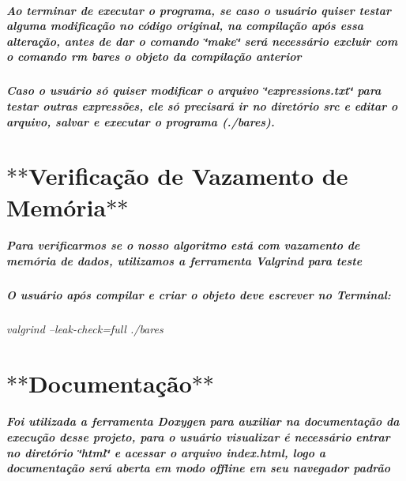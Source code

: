 \subparagraph*{Ao terminar de executar o programa, se caso o usuário quiser testar alguma modificação no código original, na compilação após essa alteração, antes de dar o comando \char`\"{}make\char`\"{} será necessário excluir com o comando {\itshape rm bares} o objeto da compilação anterior}

\subparagraph*{Caso o usuário só quiser modificar o arquivo \char`\"{}expressions.\+txt\char`\"{} para testar outras expressões, ele só precisará ir no diretório {\itshape src} e editar o arquivo, salvar e executar o programa (./bares). }

\section*{$\ast$$\ast$\+Verificação de Vazamento de Memória$\ast$$\ast$ }

\subparagraph*{Para verificarmos se o nosso algoritmo está com vazamento de memória de dados, utilizamos a ferramenta Valgrind para teste}

\subparagraph*{O usuário após compilar e criar o objeto deve escrever no Terminal\+:}

{\itshape valgrind --leak-\/check=full ./bares}

\section*{$\ast$$\ast$\+Documentação$\ast$$\ast$}

\subparagraph*{Foi utilizada a ferramenta Doxygen para auxiliar na documentação da execução desse projeto, para o usuário visualizar é necessário entrar no diretório \char`\"{}html\char`\"{} e acessar o arquivo index.\+html, logo a documentação será aberta em modo offline em seu navegador padrão}